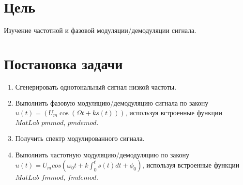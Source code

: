 \documentclass[a4paper]{article}
\begin{document}
\tableofcontents
\newpage
\section{Цель}
Изучение частотной и фазовой модуляции/демодуляции сигнала.
\section{Постановка задачи}
\begin{enumerate}
    \item Сгенерировать однотональный сигнал низкой частоты.
    \item Выполнить фазовую модуляцию/демодуляцию сигнала по закону $u(t)=(U_m\cos{(\Omega t+ks(t))})$, используя встроенные функции $MatLab$ $pmmod$, $pmdemod$.
    \item Получить спектр модулированного сигнала.
    \item Выполнить частотную модуляцию/демодуляцию по закону $u(t)=U_m cos(\omega_0 t+k\int_{0}^{t}s(t)dt+\phi_0)$, используя встроенные функции $MatLab$ $fmmod$, $fmdemod$.
\end{enumerate}
\end{document}
